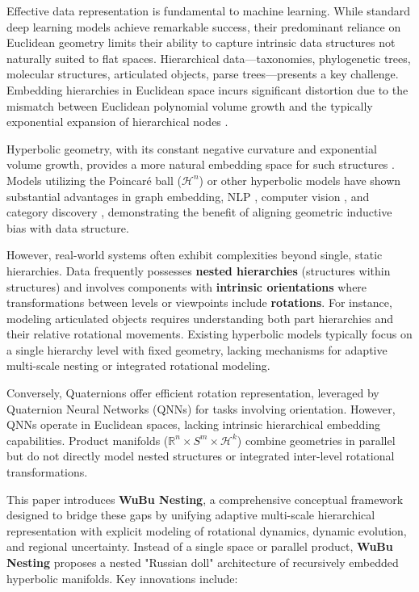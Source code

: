 \documentclass[11pt, twoside]{article} %
\newcommand{\R}{\mathbb{R}} %
\newcommand{\wubu}{\textbf{WuBu Nesting}} %
\begin{document}
Effective data representation is fundamental to machine learning. While standard deep learning models achieve remarkable success, their predominant reliance on Euclidean geometry limits their ability to capture intrinsic data structures not naturally suited to flat spaces. Hierarchical data---taxonomies, phylogenetic trees, molecular structures, articulated objects, parse trees---presents a key challenge. Embedding hierarchies in Euclidean space incurs significant distortion due to the mismatch between Euclidean polynomial volume growth and the typically exponential expansion of hierarchical nodes \cite{NickelKiela2017}.

Hyperbolic geometry, with its constant negative curvature and exponential volume growth, provides a more natural embedding space for such structures \cite{NickelKiela2017, KhrulkovEtAl2020, ErmolovEtAl2022}. Models utilizing the Poincaré ball ($\mathcal{H}^n$) or other hyperbolic models have shown substantial advantages in graph embedding, NLP \cite{GaneaEtAl2018, GulcehreEtAl2019}, computer vision \cite{KhrulkovEtAl2020, ErmolovEtAl2022, AtighEtAl2022}, and category discovery \cite{LiuHeHan2025}, demonstrating the benefit of aligning geometric inductive bias with data structure.

However, real-world systems often exhibit complexities beyond single, static hierarchies. Data frequently possesses \textbf{nested hierarchies} (structures within structures) and involves components with \textbf{intrinsic orientations} where transformations between levels or viewpoints include \textbf{rotations}. For instance, modeling articulated objects requires understanding both part hierarchies and their relative rotational movements. Existing hyperbolic models typically focus on a single hierarchy level with fixed geometry, lacking mechanisms for adaptive multi-scale nesting or integrated rotational modeling.

Conversely, Quaternions \cite{Hamilton1866} offer efficient rotation representation, leveraged by Quaternion Neural Networks (QNNs) \cite{ParcolletEtAl2019, GrassucciEtAl2021} for tasks involving orientation. However, QNNs operate in Euclidean spaces, lacking intrinsic hierarchical embedding capabilities. Product manifolds ($\R^n \times S^m \times \mathcal{H}^k$) \cite{GuEtAl2019} combine geometries in parallel but do not directly model nested structures or integrated inter-level rotational transformations.

This paper introduces \textbf{\wubu{}}, a comprehensive conceptual framework designed to bridge these gaps by unifying adaptive multi-scale hierarchical representation with explicit modeling of rotational dynamics, dynamic evolution, and regional uncertainty. Instead of a single space or parallel product, \wubu{} proposes a nested "Russian doll" architecture of recursively embedded hyperbolic manifolds. Key innovations include:
\end{document}
